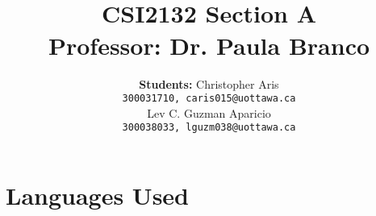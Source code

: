 \documentclass[12pt, lettersize]{article}
\title{\Large \centering{Database Project  } \\ \large \textbf{ CSI2132 Section A \\  Professor: Dr. Paula Branco} }
\author{ \large \textbf{Students:} Christopher Aris \\ 
	\texttt{300031710, caris015@uottawa.ca} \\
	Lev C. Guzman Aparicio \\
	\texttt{300038033, lguzm038@uottawa.ca}
	}
\theoremstyle{Remark}
\begin{document}
	\begin{titlepage}
		\maketitle
	\end{titlepage}

	\section{Languages Used}
	
\end{document}
